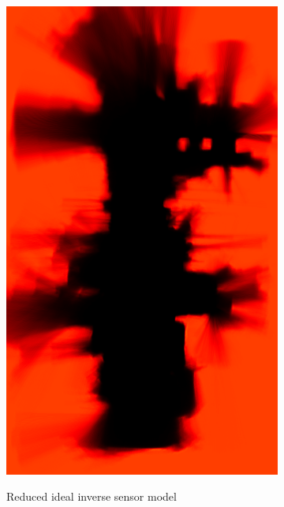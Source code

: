 \begin{figure}[tbph]
	\centering
	\begin{subfigure}[b]{0.45\textwidth}
		\includegraphics[width=1.0\textwidth]{figures/static_mapping/monte_carlo_map_hector}
		\label{fig:particle_hector_sensor-croped}
		\caption{Reduced ideal inverse sensor model}
	\end{subfigure}
	\begin{subfigure}[b]{0.45\textwidth}

\end{subfigure}
\end{figure}
